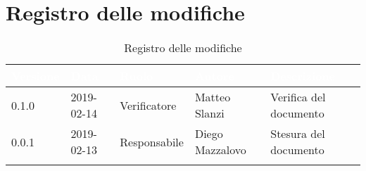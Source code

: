 \newpage

\section{Registro delle modifiche}

\begin{center}
\begin{longtable}[c]{|m{}|m{}|m{}|m{}|p{}|}
\hline
\rowcolor{bluelogo}\textbf{\textcolor{white}{Versione}} & \textbf{\textcolor{white}{Data}} & \textbf{\textcolor{white}{Ruolo}} & \textbf{\textcolor{white}{Autore}} & \textbf{\textcolor{white}{Descrizione}}\\
\hline \hline
\endfirsthead
\hline
\rowcolor{grigio}0.1.0 & 2019-02-14 & Verificatore & Matteo Slanzi & Verifica del documento \\
\hline
0.0.1 & 2019-02-13 & Responsabile & Diego Mazzalovo & Stesura del documento \\
\hline
\caption{Registro delle modifiche}
\end{longtable}
\end{center}